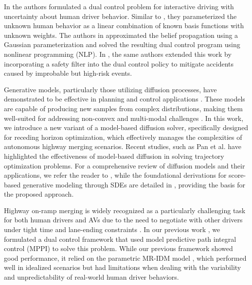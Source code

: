 \documentclass[letterpaper, 10 pt, conference]{IEEEconf}
\begin{document}
In \cite{hu2022active} the authors formulated a dual control problem for interactive driving with uncertainty about human driver behavior.
Similar to \cite{nair2022stochastic}, they parameterized the unknown human behavior as a linear combination of known basis functions with unknown weights.
The authors in \cite{hu2022active} approximated the belief propagation using a Gaussian parameterization and solved the resulting dual control program using nonlinear programming (NLP). In \cite{hu2024active}, the same authors extended this work by incorporating a safety filter into the dual control policy to mitigate accidents caused by improbable but high-risk events.

Generative models, particularly those utilizing diffusion processes, have demonstrated to be effective in planning and control applications \cite{janner2022planning, chi2023diffusion, sun2024conformal, psenka2023learning}. 
These models are capable of producing new samples from complex distributions, making them well-suited for addressing non-convex and multi-modal challenges \cite{ho2020denoising,song2019generative}. 
In this work, we introduce a new variant of a model-based diffusion solver, specifically designed for receding horizon optimization, which effectively manages the complexities of autonomous highway merging scenarios. 
Recent studies, such as Pan et al. \cite{pan2024model} have highlighted the effectiveness of model-based diffusion in solving trajectory optimization problems. 
For a comprehensive review of diffusion models and their applications, we refer the reader to \cite{yang2023diffusion}, while the foundational derivations for score-based generative modeling through SDEs are detailed in \cite{song2020score}, providing the basis for the proposed approach.

Highway on-ramp merging is widely recognized as a particularly challenging task for both human drivers and AVs due to the need to negotiate with other drivers under tight time and lane-ending constraints  \cite{rios2016survey,fernandez2021highway}. 
In our previous work \cite{knaup2024active}, we formulated a dual control framework that used model predictive path integral control (MPPI) to solve this problem. 
While our previous framework showed good performance, it relied on the parametric MR-IDM model \cite{holley2023mr}, which performed well in idealized scenarios but had limitations when dealing with the variability and unpredictability of real-world human driver behaviors. 
\end{document}
